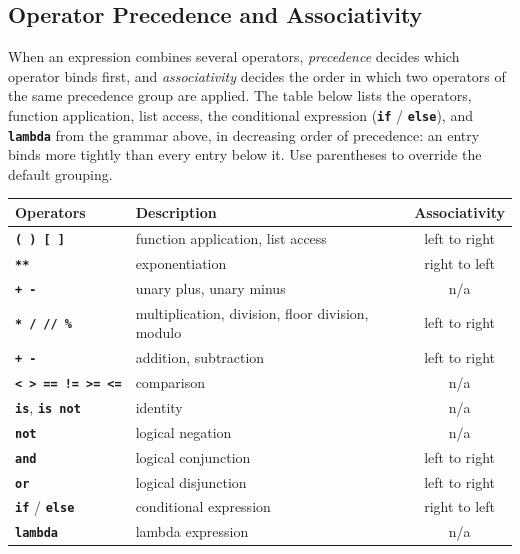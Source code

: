 \subsection*{Operator Precedence and Associativity}

When an expression combines several operators, \emph{precedence} decides
which operator binds first, and \emph{associativity} decides the order in
which two operators of the same precedence group are applied. The table
below lists the operators, function application, list access, the
conditional expression (\textbf{\texttt{if}} / \textbf{\texttt{else}}),
and \textbf{\texttt{lambda}} from the grammar above, in decreasing order
of precedence: an entry binds more tightly than every entry below it. Use
parentheses to override the default grouping.

\begin{center}
  \begin{tabular}{l|l|c}
    Operators & Description & Associativity \\ \hline
    \texttt{\textbf{( )}}\ \texttt{\textbf{[ ]}} & function application, list access & left to right \\
    \texttt{\textbf{**}} & exponentiation & right to left \\
    \texttt{\textbf{+}}\ \texttt{\textbf{-}} & unary plus, unary minus & n/a \\
    \texttt{\textbf{*}}\ \texttt{\textbf{/}}\ \texttt{\textbf{//}}\ \texttt{\textbf{\%}} & multiplication, division, floor division, modulo & left to right \\
    \texttt{\textbf{+}}\ \texttt{\textbf{-}} & addition, subtraction & left to right \\
    \texttt{\textbf{<}}\ \texttt{\textbf{>}}\ \texttt{\textbf{==}}\ \texttt{\textbf{!=}}\ \texttt{\textbf{>=}}\ \texttt{\textbf{<=}} & comparison & n/a \\
    \textbf{\texttt{is}}, \textbf{\texttt{is not}} & identity & n/a \\
    \textbf{\texttt{not}} & logical negation & n/a \\
    \textbf{\texttt{and}} & logical conjunction & left to right \\
    \textbf{\texttt{or}} & logical disjunction & left to right \\
    \textbf{\texttt{if}} / \textbf{\texttt{else}} & conditional expression & right to left \\
    \textbf{\texttt{lambda}} & lambda expression & n/a \\
  \end{tabular}
\end{center}

